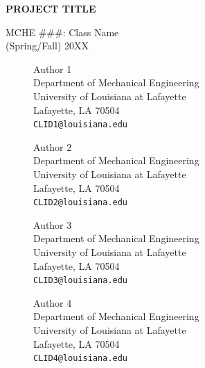 \documentclass[11pt]{article}
\begin{document}
\thispagestyle{empty}
\begin{center}
\vspace*{1.5in}
{\LARGE \textbf{PROJECT TITLE}} %

{\Large MCHE \#\#\#: Class Name\\ \vspace*{0.1in} (Spring/Fall) 20XX}

\vspace*{2.5in}

\begin{figure}[!h]
\begin{minipage}{0.45\textwidth}
\begin{center}
Author 1 \\
Department of Mechanical Engineering\\
University of Louisiana at Lafayette\\
Lafayette, LA 70504\\
{\tt CLID1@louisiana.edu}
\end{center}
\end{minipage}
\hspace{0.08\textwidth}
\begin{minipage}{0.45\textwidth}
\begin{center}
Author 2 \\
Department of Mechanical Engineering\\
University of Louisiana at Lafayette\\
Lafayette, LA 70504\\
\tt{CLID2@louisiana.edu}
\end{center}
\end{minipage}
\end{figure}

\vspace{0.2in}
\begin{figure}[!h]
\begin{minipage}{0.45\textwidth}
\begin{center}
Author 3 \\
Department of Mechanical Engineering\\
University of Louisiana at Lafayette\\
Lafayette, LA 70504\\
{\tt CLID3@louisiana.edu}
\end{center}
\end{minipage}
\hspace{0.08\textwidth}
\begin{minipage}{0.45\textwidth}
\begin{center}
Author 4 \\
Department of Mechanical Engineering\\
University of Louisiana at Lafayette\\
Lafayette, LA 70504\\
\tt{CLID4@louisiana.edu}
\end{center}
\end{minipage}
\end{figure}
\end{center}
\end{document}
